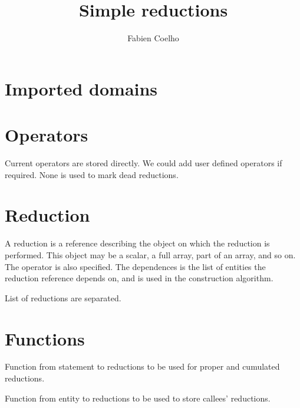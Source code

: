 \documentclass{article}
\title{Simple reductions}
\author{Fabien Coelho}
\begin{document}
\maketitle

\section{Imported domains}
\label{sec:import}


\section{Operators}
\label{sec:operators}

Current operators are stored directly.
We could add user defined operators if required.
None is used to mark dead reductions. 



\section{Reduction}
\label{sec:reduction}

A reduction is a reference describing the object on which the reduction is
performed. This object may be a scalar, a full array, part of an array,
and so on. The operator is also specified. The dependences is the list of
entities the reduction reference depends on, and is used in the
construction algorithm. 


List of reductions are separated.



\section{Functions}
\label{sec:functions}

Function from statement to reductions to be used for proper and cumulated
reductions. 


Function from entity to reductions to be used to store callees'
reductions. 

\end{document}
